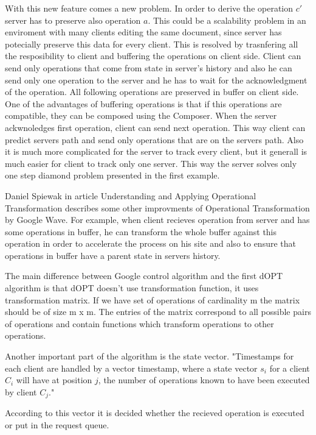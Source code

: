 \documentclass[12pt,oneside]{fithesis2}
\begin{document}
\par With this new feature comes a new problem. In order to derive the operation \(c'\) server has to preserve also operation \(a\). This could be a scalability problem in an enviroment with many clients editing the same document, since server has potecially preserve this data for every client. This is resolved by trasnfering all the resposibility to client and buffering the operations on client side. Client can send only operations that come from state in server's history and also he can send only one operation to the server and he has to wait for the acknowledgment of the operation. All following operations are preserved in buffer on client side. One of the advantages of buffering operations is that if this operations are compatible, they can be composed using the Composer. When the server ackwnoledges first operation, client can send next operation. This way client can predict servers path and send only operations that are on the servers path. Also it is much more complicated for the server to track every client, but it generall is much easier for client to track only one server. This way the server solves only one step diamond problem presented in the first example.
\par Daniel Spiewak in article Understanding and Applying Operational Transformation \cite{Spiewak} describes some other improvments of Operational Transformation by Google Wave. For example, when client recieves operation from server and has some operations in buffer, he can transform the whole buffer against this operation in order to accelerate the process on his site and also to ensure that operations in buffer have a parent state in servers history.
\par The main difference between Google control algorithm and the first dOPT algorithm is that dOPT doesn't use transformation function, it uses transformation matrix. If we have set of operations of cardinality m the matrix should be of size m x m. The entries of the matrix correspond to all possible pairs of operations and contain functions which transform operations to other operations. \par Another important part of the algorithm is the state vector. "Time\-stamps for each client are handled by a vector timestamp, where a state vector \(s_i\) for a client \(C_i \) will have at position \(j\), the number of operations known to have been executed by client \(C_j\)." \cite{Leung} \par According to this vector it is decided whether the recieved operation is executed or put in the request queue.
\end{document}
